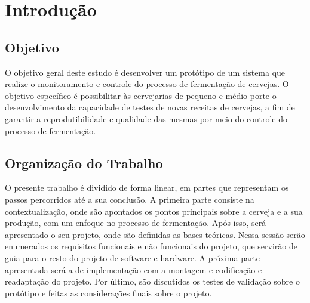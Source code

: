 \chapter{Introdução}

\section{Objetivo}

O objetivo geral deste estudo é desenvolver um protótipo de um sistema que realize o monitoramento e controle do processo de fermentação de cervejas.
O objetivo específico é possibilitar às cervejarias de pequeno e médio porte o desenvolvimento da capacidade de testes de novas receitas de cervejas, 
a fim de garantir a reprodutibilidade e qualidade das mesmas por meio do controle do processo de fermentação.


\section{Organização do Trabalho}

O presente trabalho é dividido de forma linear, em partes que representam os passos percorridos até a sua conclusão. A primeira parte consiste na contextualização, onde são apontados os pontos principais sobre a cerveja e a sua produção, com um enfoque no processo de fermentação. Após isso, será apresentado o seu projeto, onde são definidas as bases teóricas. Nessa sessão serão enumerados os requisitos funcionais e não funcionais do projeto, que servirão de guia para o resto do projeto de software e hardware. A próxima parte apresentada será a de implementação com a montagem e codificação e readaptação do projeto. Por último, são discutidos os testes de validação sobre o protótipo e feitas as considerações finais sobre o projeto.
